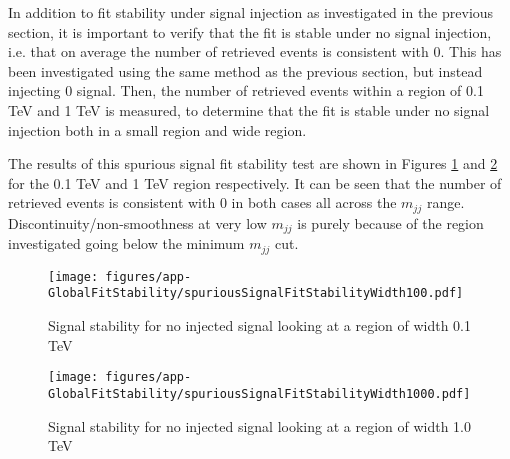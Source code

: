 In addition to fit stability under signal injection as investigated in the previous section, it is important to verify that the fit is stable under no signal injection, i.e. that on average the number of retrieved events is consistent with 0. This has been investigated using the same method as the previous section, but instead injecting 0 signal. Then, the number of retrieved events within a region of 0.1 TeV and 1 TeV is measured, to determine that the fit is stable under no signal injection both in a small region and wide region.

The results of this spurious signal fit stability test are shown in Figures \ref{fig:SpuriousSignalInjectionFitStabilityStudy0.1TeVRegion} and \ref{fig:SpuriousSignalInjectionFitStabilityStudy1.0TeVRegion} for the 0.1 TeV and 1 TeV region respectively. It can be seen that the number of retrieved events is consistent with 0 in both cases all across the $m_{jj}$ range. Discontinuity/non-smoothness at very low $m_{jj}$ is purely because of the region investigated going below the minimum $m_{jj}$ cut.

\begin{figure}
    \centering
    \texttt{[image: figures/app-GlobalFitStability/spuriousSignalFitStabilityWidth100.pdf]}
    \caption{Signal stability for no injected signal looking at a region of width 0.1 TeV}
    \label{fig:SpuriousSignalInjectionFitStabilityStudy0.1TeVRegion}
\end{figure}
\begin{figure}
    \centering
    \texttt{[image: figures/app-GlobalFitStability/spuriousSignalFitStabilityWidth1000.pdf]}
    \caption{Signal stability for no injected signal looking at a region of width 1.0 TeV}
    \label{fig:SpuriousSignalInjectionFitStabilityStudy1.0TeVRegion}
\end{figure}
